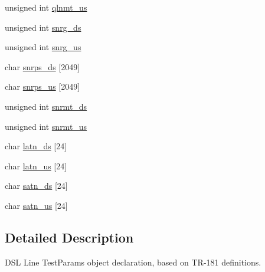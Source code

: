 \begin{DoxyCompactItemize}
\item 
unsigned int \hyperlink{structdsl__fapi__line__test__params__obj_a58aaec5d828de778148762eccb6e0a03}{qlnmt\-\_\-us}
\item 
unsigned int \hyperlink{structdsl__fapi__line__test__params__obj_a6bc1ac31ab8f8c3f7d2b7734b176b920}{snrg\-\_\-ds}
\item 
unsigned int \hyperlink{structdsl__fapi__line__test__params__obj_aab1050460405b591f11366b8f0109e52}{snrg\-\_\-us}
\item 
char \hyperlink{structdsl__fapi__line__test__params__obj_a31f5916b0efd18693c30ac5ab6bf95e0}{snrps\-\_\-ds} \mbox{[}2049\mbox{]}
\item 
char \hyperlink{structdsl__fapi__line__test__params__obj_a2bb54209cc9ef6b6e17b57b723e59293}{snrps\-\_\-us} \mbox{[}2049\mbox{]}
\item 
unsigned int \hyperlink{structdsl__fapi__line__test__params__obj_a4fac6ebeb3e66e201680646e0118d406}{snrmt\-\_\-ds}
\item 
unsigned int \hyperlink{structdsl__fapi__line__test__params__obj_adbbfa69841615a3fcd552726cc18a6a2}{snrmt\-\_\-us}
\item 
char \hyperlink{structdsl__fapi__line__test__params__obj_a35ceece146111cad9955e33a28c721ec}{latn\-\_\-ds} \mbox{[}24\mbox{]}
\item 
char \hyperlink{structdsl__fapi__line__test__params__obj_a1c23bf6bcf03cfbe5fe720fa3d471742}{latn\-\_\-us} \mbox{[}24\mbox{]}
\item 
char \hyperlink{structdsl__fapi__line__test__params__obj_ad5c0172d2a20781c58dbcb72a41871fa}{satn\-\_\-ds} \mbox{[}24\mbox{]}
\item 
char \hyperlink{structdsl__fapi__line__test__params__obj_a6445be0f67ecc319197734403e442b76}{satn\-\_\-us} \mbox{[}24\mbox{]}
\end{DoxyCompactItemize}


\subsection{Detailed Description}
D\-S\-L Line Test\-Params object declaration, based on T\-R-\/181 definitions. 

